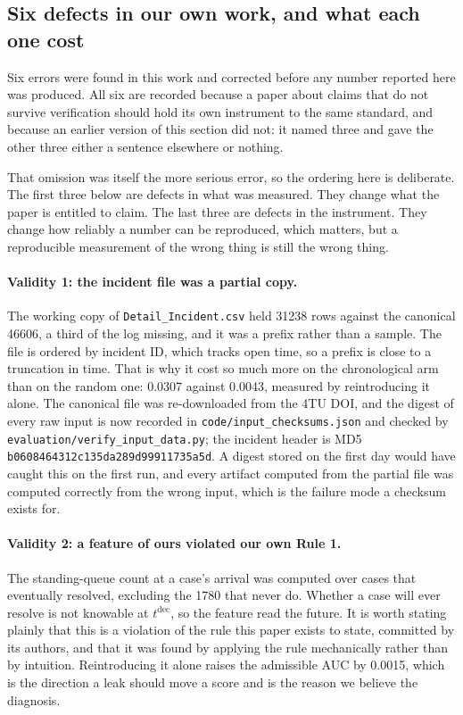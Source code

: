 \subsection{Six defects in our own work, and what each one cost}
\label{sec:harness-defects}

Six errors were found in this work and corrected before any number reported here was
produced. All six are recorded because a paper about claims that do not survive verification
should hold its own instrument to the same standard, and because an earlier version of this
section did not: it named three and gave the other three either a sentence elsewhere or
nothing.

That omission was itself the more serious error, so the ordering here is deliberate. The
first three below are defects in what was measured. They change what the paper is entitled
to claim. The last three are defects in the instrument. They change how reliably a number
can be reproduced, which matters, but a reproducible measurement of the wrong thing is
still the wrong thing.

\paragraph{Validity 1: the incident file was a partial copy.} The working copy of
\texttt{Detail\_Incident.csv} held \num{31238} rows against the canonical
\num{46606}, a third of the log missing, and it was a prefix rather than a sample. The file is
ordered by incident ID, which tracks open time, so a prefix is close to a truncation in time.
That is why it cost so much more on the chronological arm than on the random one:
\num{0.0307} against \num{0.0043}, measured by reintroducing it alone. The canonical file was
re-downloaded from the 4TU DOI, and the digest of every raw input is now recorded in
\texttt{code/input\_checksums.json} and checked by \texttt{evaluation/verify\_input\_data.py};
the incident header is MD5 \texttt{b0608464312c135da289d99911735a5d}. A digest stored on the first day
would have caught this on the first run, and every artifact computed from the partial file
was computed correctly from the wrong input, which is the failure mode a checksum exists
for.

\paragraph{Validity 2: a feature of ours violated our own Rule 1.} The standing-queue
count at a case's arrival was computed over cases that eventually resolved, excluding the
\num{1780} that never do. Whether a case will ever resolve is not knowable at
$t^{\mathrm{dec}}$, so the feature read the future. It is worth stating plainly that this
is a violation of the rule this paper exists to state, committed by its authors, and that it
was found by applying the rule mechanically rather than by intuition. Reintroducing it alone
raises the admissible AUC by \num{0.0015}, which is the direction a leak should move a
score and is the reason we believe the diagnosis.

